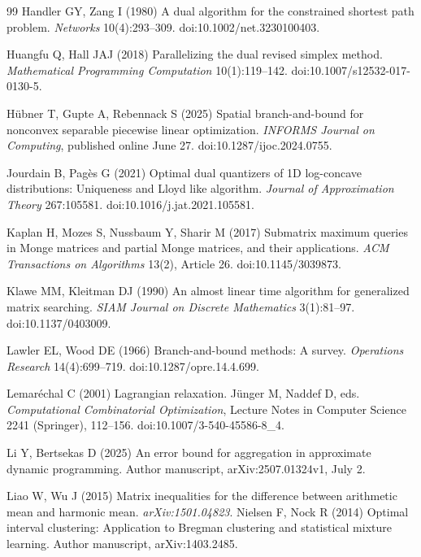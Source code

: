 \begin{thebibliography}{99}
Handler GY, Zang I (1980) A dual algorithm for the constrained shortest path problem. \emph{Networks} 10(4):293--309. doi:10.1002/net.3230100403.

Huangfu Q, Hall JAJ (2018) Parallelizing the dual revised simplex method. \emph{Mathematical Programming Computation} 10(1):119--142. doi:10.1007/s12532-017-0130-5.

H{\"u}bner T, Gupte A, Rebennack S (2025) Spatial branch-and-bound for nonconvex separable piecewise linear optimization. \emph{INFORMS Journal on Computing}, published online June 27. doi:10.1287/ijoc.2024.0755.

Jourdain B, Pag\`es G (2021) Optimal dual quantizers of 1D log-concave distributions: Uniqueness and Lloyd like algorithm. \emph{Journal of Approximation Theory} 267:105581. doi:10.1016/j.jat.2021.105581.

Kaplan H, Mozes S, Nussbaum Y, Sharir M (2017) Submatrix maximum queries in Monge matrices and partial Monge matrices, and their applications. \emph{ACM Transactions on Algorithms} 13(2), Article 26. doi:10.1145/3039873.

Klawe MM, Kleitman DJ (1990) An almost linear time algorithm for generalized matrix searching. \emph{SIAM Journal on Discrete Mathematics} 3(1):81--97. doi:10.1137/0403009.

Lawler EL, Wood DE (1966) Branch-and-bound methods: A survey. \emph{Operations Research} 14(4):699--719. doi:10.1287/opre.14.4.699.

Lemar\'echal C (2001) Lagrangian relaxation. J\"unger M, Naddef D, eds. \emph{Computational Combinatorial Optimization}, Lecture Notes in Computer Science 2241 (Springer), 112--156. doi:10.1007/3-540-45586-8\_4.

Li Y, Bertsekas D (2025) An error bound for aggregation in approximate dynamic programming. Author manuscript, arXiv:2507.01324v1, July 2.

 Liao W, Wu J (2015) Matrix inequalities for the difference between arithmetic mean and harmonic mean. \emph{arXiv:1501.04823}.
Nielsen F, Nock R (2014) Optimal interval clustering: Application to Bregman clustering and statistical mixture learning. Author manuscript, arXiv:1403.2485.


\end{thebibliography}
